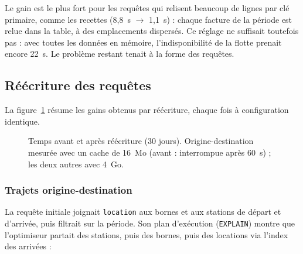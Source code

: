 Le gain est le plus fort pour les requêtes qui relisent beaucoup de lignes par clé primaire, comme les recettes (8,8~s $\to$ 1,1~s) : chaque facture de la période est relue dans la table, à des emplacements dispersés. Ce réglage ne suffisait toutefois pas : avec toutes les données en mémoire, l'indisponibilité de la flotte prenait encore 22~s. Le problème restant tenait à la forme des requêtes.

\subsection{Réécriture des requêtes}

La figure~\ref{fig:optimisations} résume les gains obtenus par réécriture, chaque fois à configuration identique.

\begin{figure}[htbp]\centering
{}
\caption{Temps avant et après réécriture (30 jours). Origine-destination mesurée avec un cache de 16~Mo (avant : interrompue après 60~s) ; les deux autres avec 4~Go.}\label{fig:optimisations}
\end{figure}

\subsubsection{Trajets origine-destination}

La requête initiale joignait \texttt{location} aux bornes et aux stations de départ et d'arrivée, puis filtrait sur la période. Son plan d'exécution (\texttt{EXPLAIN}) montre que l'optimiseur partait des stations, puis des bornes, puis des locations via l'index des arrivées :

